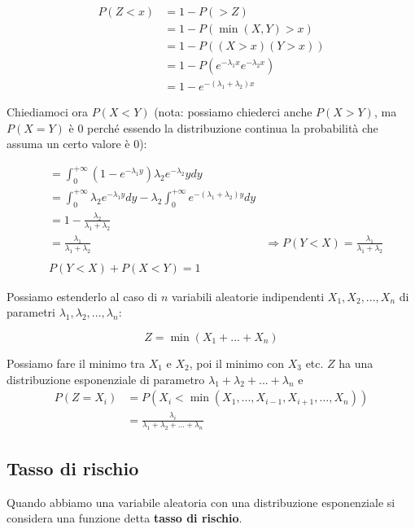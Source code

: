 \documentclass[a4paper,12pt]{book}
\begin{document}
\begin{align*}
	P(Z < x) & = 1 - P( > Z) \\
	& = 1 - P(\min(X, Y) > x) \\
	& = 1 - P((X > x)(Y > x)) \\
	& = 1 - P(e^{-\lambda_1 x} e^{-\lambda_2 x}) \\
	& = 1 - e^{-(\lambda_1 + \lambda_2)x}
\end{align*}

Chiediamoci ora $ P(X < Y) $ (nota: possiamo chiederci anche $ P(X > Y) $, ma $ P(X=Y) $ è 0 perché essendo la distribuzione continua la probabilità che assuma un certo valore è 0):

\begin{align*}
	& = \int_{0}^{+\infty} (1- e^{-\lambda_1 y}) \lambda_2 e^{-\lambda_2}y dy \\
	& = \int_{0}^{+\infty} \lambda_2 e^{-\lambda_1 y} dy -\lambda_2 \int_{0}^{+\infty} e^{-(\lambda_1 + \lambda_2)y} dy \\
	& = 1 - \frac{\lambda_2}{\lambda_1 + \lambda_2} \\
	& = \frac{\lambda_1}{\lambda_1 + \lambda_2}
	& \Rightarrow P(Y < X) = \frac{\lambda_1}{\lambda_1 + \lambda_2}
	\\
	\\
	& P(Y < X) + P(X < Y) = 1 %
\end{align*}

Possiamo estenderlo al caso di $ n $ variabili aleatorie indipendenti $ X_1, X_2, ..., X_n $ di parametri $ \lambda_1, \lambda_2, ..., \lambda_n $:

$$ Z = \min(X_1 + ... + X_n) $$

Possiamo fare il minimo tra $ X_1 $ e $ X_2 $, poi il minimo con $ X_3 $ etc. 
$ Z $ ha una distribuzione esponenziale di parametro $ \lambda_1 + \lambda_2 + ... + \lambda_n $ e 
\begin{align*}
	P(Z = X_i) & = P(X_i < \min(X_1, ..., X_{i-1}, X_{i+1}, ..., X_n)) \\
	& = \frac{\lambda_i}{\lambda_1 + \lambda_2 + ... + \lambda_n}
\end{align*}

\subsection{Tasso di rischio} %
Quando abbiamo una variabile aleatoria con una distribuzione esponenziale si considera una funzione detta \textbf{tasso di rischio}. %
\end{document}
